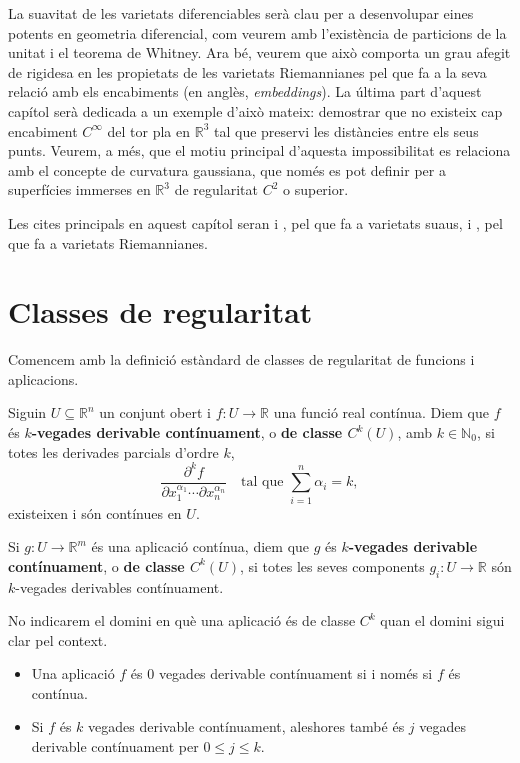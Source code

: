 La suavitat de les varietats diferenciables serà clau per a desenvolupar eines potents en geometria diferencial, com veurem amb l'existència de particions de la unitat {\color{blue} i el teorema de Whitney}. Ara bé, veurem que això comporta un grau afegit de rigidesa en les propietats de les varietats Riemannianes pel que fa a la seva relació amb els encabiments (en anglès, \textit{embeddings}). La última part d'aquest capítol serà dedicada a un exemple d'això mateix: demostrar que no existeix cap encabiment  $C^\infty$ del tor pla en $\mathbb R^3$ tal que preservi les distàncies entre els seus punts. Veurem, a més, que el motiu principal d'aquesta impossibilitat es relaciona amb el concepte de curvatura gaussiana, que només es pot definir per a superfícies immerses en $\mathbb R^3$ de regularitat $C^2$ o superior. 

{\color{blue} Les cites principals en aquest capítol seran \cite{lee2013} i \cite{warner1983}, pel que fa a varietats suaus, i \cite{chavel2006}, pel que fa a varietats Riemannianes.}

\section{Classes de regularitat}
Comencem amb la definició estàndard de classes de regularitat de funcions i aplicacions.
\begin{defi}
    Siguin $U\subseteq\mathbb R^n$ un conjunt obert i $f:U\to\mathbb R$ una funció real contínua.
    Diem que $f$ és \textbf{ $k$-vegades derivable contínuament}, o \textbf{de classe $C^k(U)$}, amb $k\in\mathbb N_0$, si totes les derivades parcials d'ordre $k$, \begin{equation*}
        \frac{\partial^k f}{\partial x_1^{\alpha_1}\cdots\partial x_n^{\alpha_n}}\quad\text{tal que }\sum_{i=1}^n\alpha_i = k,
    \end{equation*} existeixen i són contínues en $U$.

    Si $g:U\to\mathbb R^m$ és una aplicació contínua, diem que $g$ és \textbf{ $k$-vegades derivable contínuament}, o \textbf{de classe $C^k(U)$}, si totes les seves components $g_i:U\to\mathbb R$ són $k$-vegades derivables contínuament.
\end{defi}
\begin{nota}
    No indicarem el domini en què una aplicació és de classe $C^k$ quan el domini sigui clar pel context.
\end{nota}

\begin{obss}
\end{obss}
\begin{itemize}
    \item Una aplicació $f$ és $0$ vegades derivable contínuament si i només si $f$ és contínua. 
    \item Si $f$ és $k$ vegades derivable contínuament, aleshores també és $j$ vegades derivable contínuament per $0\le j\le k$.
\end{itemize}

